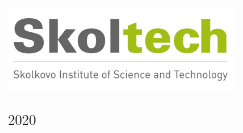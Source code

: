 \documentclass[a4paper, 11pt, oneside]{Thesis}  %
\begin{document}
\appendix 

 







\backmatter

\label{Bibliography}


\begin{titlepage}
 \begin{center}
 \phantom{a}\vspace{13.2cm}
 
\includegraphics[width=6cm]{sk.png}
  
 
  \vspace{7cm}
  
  2020

  \vspace{2cm}

  
  
  
 \end{center}

\end{titlepage}
\end{document}
